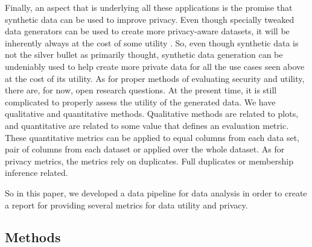 Finally, an aspect that is underlying all these applications is the promise that synthetic data can be used to improve privacy. Even though specially tweaked data generators can be used to create more privacy-aware datasets, it will be inherently always at the cost of some utility \cite{stadler_synthetic_2020}. So, even though synthetic data is not the silver bullet as primarily thought, synthetic data generation can be undeniably used to help create more private data for all the use cases seen above at the cost of its utility. As for proper methods of evaluating security and utility, there are, for now, open research questions. At the present time, it is still complicated to properly assess the utility of the generated data. We have qualitative and quantitative methods. Qualitative methods are related to plots, and quantitative are related to some value that defines an evaluation metric. These quantitative metrics can be applied to equal columns from each data set, pair of columns from each dataset or applied over the whole dataset. As for privacy metrics, the metrics rely on duplicates. Full duplicates or membership inference related. 

So in this paper, we developed a data pipeline for data analysis in order to create a report for providing several metrics for data utility and privacy.


\subsection{Methods}


